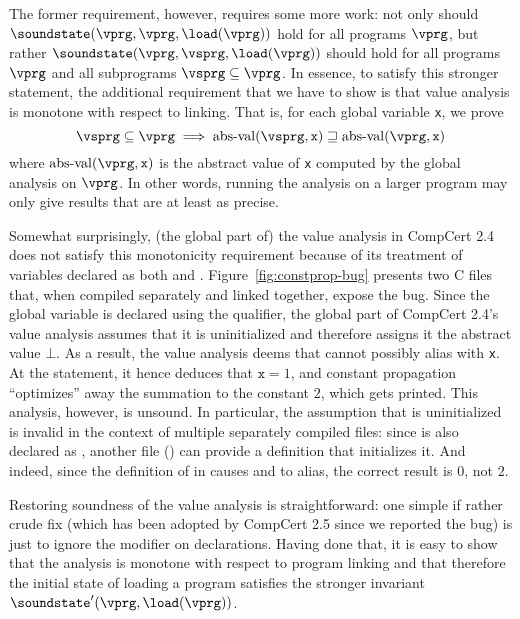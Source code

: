 
The former requirement, however, requires some more work:
not only should $\soundstate(\vprg,\vprg,\load(\vprg))$ hold for all programs $\vprg$,
but rather $\soundstate(\vprg,\vsprg,\load(\vprg))$ should hold for all programs $\vprg$ and all subprograms $\vsprg\subseteq\vprg$.
In essence, to satisfy this stronger statement, the additional requirement that we have to show is that value analysis is monotone with respect to linking.
That is, for each global variable \texttt{x}, we prove
\[
\vsprg \subseteq \vprg \implies  \mathrm{abs\text{-}val}(\vsprg,\texttt{x}) \sqsupseteq \mathrm{abs\text{-}val}(\vprg,\texttt{x})
\]
where $\mathrm{abs\text{-}val}(\vprg,\texttt{x})$ is the abstract value of \texttt{x} computed by the global analysis on $\vprg$.
In other words, running the analysis on a larger program may only give results that are at least as precise.

Somewhat surprisingly, (the global part of) the value analysis in
CompCert 2.4 does not satisfy this monotonicity requirement because of
its treatment of variables declared as both  and
.  Figure~\ref{fig:constprop-bug} presents two C files that,
when compiled separately and linked together, expose the bug.  Since
the global variable  is declared using the 
qualifier, the global part of CompCert 2.4's value analysis assumes
that it is uninitialized and therefore assigns it the abstract value
$\bot$.  As a result, the value analysis deems that  cannot
possibly alias with \texttt{x}.  At the  statement, it
hence deduces that $\texttt{x}=1$, and constant propagation
``optimizes'' away the summation  to the constant $2$, which
gets printed.  This analysis, however, is unsound.  In particular, the
assumption that  is uninitialized is invalid in the context
of multiple separately compiled files: since  is also
declared as , another file () can provide a
definition that initializes it.  And indeed, since the definition of
 in  causes  and  to alias, the
correct result is $0$, not $2$.

Restoring soundness of the value analysis is straightforward: one
simple if rather crude fix (which has been adopted by CompCert 2.5
since we reported the bug) is just to ignore the  modifier
on  declarations.  Having done that, it is easy to show
that the analysis is monotone with respect to program linking and that
therefore the initial state of loading a program satisfies the
stronger invariant $\soundstate'(\vprg,\load(\vprg))$.


